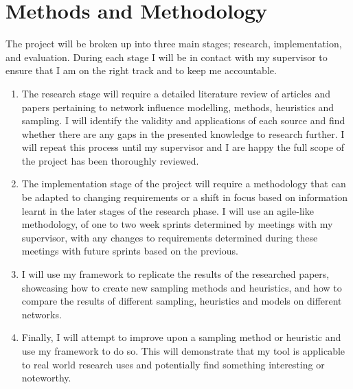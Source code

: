 \documentclass{article}
\begin{document}
\section{Methods and Methodology}

The project will be broken up into three main stages; research, implementation, and evaluation.
During each stage I will be in contact with my supervisor to ensure that I am on the right track and to keep me accountable.

\begin{enumerate}

	\item The research stage will require a detailed literature review of articles and papers pertaining to network influence modelling, methods, heuristics and sampling.
	      I will identify the validity and applications of each source and find whether there are any gaps in the presented knowledge to research further.
	      I will repeat this process until my supervisor and I are happy the full scope of the project has been thoroughly reviewed.

	\item The implementation stage of the project will require a methodology that can be adapted to changing requirements or a shift in focus based on information learnt in the later stages of the research phase.
	      I will use an agile-like methodology, of one to two week sprints determined by meetings with my supervisor, with any changes to requirements determined during these meetings with future sprints based on the previous.

	\item I will use my framework to replicate the results of the researched papers, showcasing how to create new sampling methods and heuristics, and how to compare the results of different sampling, heuristics and models on different networks.

	\item Finally, I will attempt to improve upon a sampling method or heuristic and use my framework to do so. This will demonstrate that my tool is applicable to real world research uses and potentially find something interesting or noteworthy.

\end{enumerate}
\end{document}
